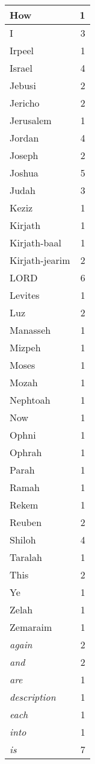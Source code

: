 \begin{center}
\begin{longtable}{l|r}
How & 1\\ \hline 
I & 3\\ \hline 
Irpeel & 1\\ \hline 
Israel & 4\\ \hline 
Jebusi & 2\\ \hline 
Jericho & 2\\ \hline 
Jerusalem & 1\\ \hline 
Jordan & 4\\ \hline 
Joseph & 2\\ \hline 
Joshua & 5\\ \hline 
Judah & 3\\ \hline 
Keziz & 1\\ \hline 
Kirjath & 1\\ \hline 
Kirjath-baal & 1\\ \hline 
Kirjath-jearim & 2\\ \hline 
LORD & 6\\ \hline 
Levites & 1\\ \hline 
Luz & 2\\ \hline 
Manasseh & 1\\ \hline 
Mizpeh & 1\\ \hline 
Moses & 1\\ \hline 
Mozah & 1\\ \hline 
Nephtoah & 1\\ \hline 
Now & 1\\ \hline 
Ophni & 1\\ \hline 
Ophrah & 1\\ \hline 
Parah & 1\\ \hline 
Ramah & 1\\ \hline 
Rekem & 1\\ \hline 
Reuben & 2\\ \hline 
Shiloh & 4\\ \hline 
Taralah & 1\\ \hline 
This & 2\\ \hline 
Ye & 1\\ \hline 
Zelah & 1\\ \hline 
Zemaraim & 1\\ \hline 
\emph{again} & 2\\ \hline 
\emph{and} & 2\\ \hline 
\emph{are} & 1\\ \hline 
\emph{description} & 1\\ \hline 
\emph{each} & 1\\ \hline 
\emph{into} & 1\\ \hline 
\emph{is} & 7\\ \hline 

\end{longtable}
\end{center}

